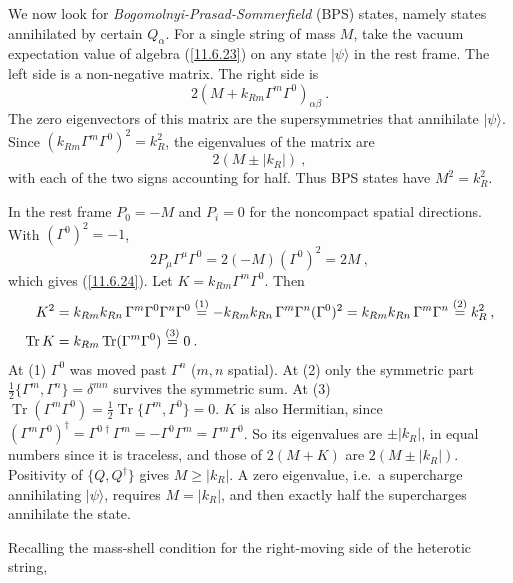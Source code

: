 We now look for \emph{Bogomolnyi-Prasad-Sommerfield} (BPS) states, namely states annihilated by certain $Q_{\alpha}$. For a single string of mass $M$, take the vacuum expectation value of algebra (\ref{11.6.23}) on any state $\lvert \psi\rangle$ in the rest frame. The left side is a non-negative matrix. The right side is
\begin{equation}
	2(M+k_{Rm}\Gamma^{m}\Gamma^{0})_{\alpha\beta} \:. \label{11.6.24}
\end{equation}
The zero eigenvectors of this matrix are the supersymmetries that annihilate $\lvert\psi\rangle$. Since $(k_{Rm} \Gamma^{m} \Gamma^{0})^{2} = k_{R}^{2}$, the eigenvalues of the matrix are
\begin{equation}
	2(M\pm\lvert k_{R}\rvert) \:, \label{11.6.25}
\end{equation}
with each of the two signs accounting for half. Thus BPS states have $M^{2}=k_{R}^{2}$.
\begin{tcolorbox}[breakable]
	\begin{remark}
		In the rest frame $P_{0}=-M$ and $P_{i}=0$ for the noncompact spatial directions. With $(\Gamma^{0})^{2}=-1$,
		\begin{equation*}
			2P_{\mu}\Gamma^{\mu}\Gamma^{0}=2(-M)(\Gamma^{0})^{2}=2M\:,
		\end{equation*}
		which gives (\ref{11.6.24}). Let $K=k_{Rm}\Gamma^{m}\Gamma^{0}$. Then
		\begin{align*}
			K^{2}&=k_{Rm}k_{Rn}\,\Gamma^{m}\Gamma^{0}\Gamma^{n}\Gamma^{0}\overset{(1)}{=}-k_{Rm}k_{Rn}\,\Gamma^{m}\Gamma^{n}(\Gamma^{0})^{2}
			=k_{Rm}k_{Rn}\,\Gamma^{m}\Gamma^{n}\overset{(2)}{=}k_{R}^{2}\:,\\
			\operatorname{Tr}K&=k_{Rm}\operatorname{Tr}(\Gamma^{m}\Gamma^{0})\overset{(3)}{=}0\:.
		\end{align*}
		At (1) $\Gamma^{0}$ was moved past $\Gamma^{n}$ ($m,n$ spatial). At (2) only the symmetric part $\frac{1}{2}\{\Gamma^{m},\Gamma^{n}\}=\delta^{mn}$ survives the symmetric sum. At (3) $\operatorname{Tr}(\Gamma^{m}\Gamma^{0})=\frac{1}{2}\operatorname{Tr}\{\Gamma^{m},\Gamma^{0}\}=0$. $K$ is also Hermitian, since $(\Gamma^{m}\Gamma^{0})^{\dagger}=\Gamma^{0\dagger}\Gamma^{m}=-\Gamma^{0}\Gamma^{m}=\Gamma^{m}\Gamma^{0}$. So its eigenvalues are $\pm\lvert k_{R}\rvert$, in equal numbers since it is traceless, and those of $2(M+K)$ are $2(M\pm\lvert k_{R}\rvert)$. Positivity of $\{Q,Q^{\dagger}\}$ gives $M\geq\lvert k_{R}\rvert$. A zero eigenvalue, i.e.\ a supercharge annihilating $\lvert\psi\rangle$, requires $M=\lvert k_{R}\rvert$, and then exactly half the supercharges annihilate the state.
	\end{remark}
\end{tcolorbox} Recalling the mass-shell condition for the right-moving side of the heterotic string,
